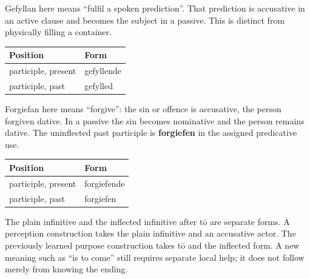 Gefyllan here means “fulfil a spoken prediction”. That prediction is accusative in an active clause and becomes the subject in a passive. This is distinct from physically filling a container.

\par\begingroup
\fontsize{10.5}{13.2}\selectfont
\setlength{\LTleft}{0pt}\setlength{\LTright}{\fill}
\noindent
\begin{tabular}{@{}>{\raggedright\arraybackslash}p{71.92mm}>{\raggedright\arraybackslash}p{49.26mm}@{}}
\toprule
\textbf{Position} & \textbf{Form} \\
\midrule
participle, present & gefyllende \\
participle, past & gefylled \\
\bottomrule
\end{tabular}
\par\endgroup

Forgiefan here means “forgive”: the sin or offence is accusative, the person forgiven dative. In a passive the sin becomes nominative and the person remains dative. The uninflected past participle is \textbf{forgiefen} in the assigned predicative use.

\par\begingroup
\fontsize{10.5}{13.2}\selectfont
\setlength{\LTleft}{0pt}\setlength{\LTright}{\fill}
\noindent
\begin{tabular}{@{}>{\raggedright\arraybackslash}p{69.12mm}>{\raggedright\arraybackslash}p{52.07mm}@{}}
\toprule
\textbf{Position} & \textbf{Form} \\
\midrule
participle, present & forgiefende \\
participle, past & forgiefen \\
\bottomrule
\end{tabular}
\par\endgroup

The plain infinitive and the inflected infinitive after tō are separate forms. A perception construction takes the plain infinitive and an accusative actor. The previously learned purpose construction takes tō and the inflected form. A new meaning such as “is to come” still requires separate local help; it does not follow merely from knowing the ending.

